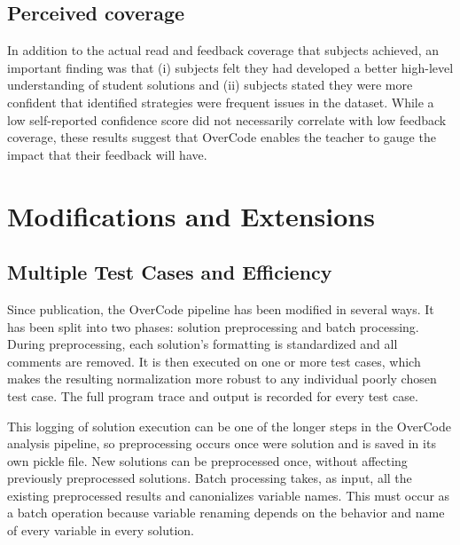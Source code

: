 \subsection{Perceived coverage}
In addition to the actual read and feedback coverage that subjects achieved, an important finding was that (i) subjects felt they had developed a better high-level understanding of student solutions and (ii) subjects stated they were more confident that identified strategies were frequent issues in the dataset. While a low self-reported confidence score did not necessarily correlate with low feedback coverage, these results suggest that OverCode enables the teacher to gauge the impact that their feedback will have.

\section{Modifications and Extensions}


\subsection{Multiple Test Cases and Efficiency} 
Since publication, the OverCode pipeline has been modified in several ways. It has been split into two phases: solution preprocessing and batch processing. During preprocessing, each solution's formatting is standardized and all comments are removed. It is then executed on one or more test cases, which makes the resulting normalization more robust to any individual poorly chosen test case. The full program trace and output is recorded for every test case. 

This logging of solution execution can be one of the longer steps in the OverCode analysis pipeline, so preprocessing occurs once were solution and is saved in its own pickle file. New solutions can be preprocessed once, without affecting previously preprocessed solutions. Batch processing takes, as input, all the existing preprocessed results and canonializes variable names. This must occur as a batch operation because variable renaming depends on the behavior and name of every variable in every solution.

